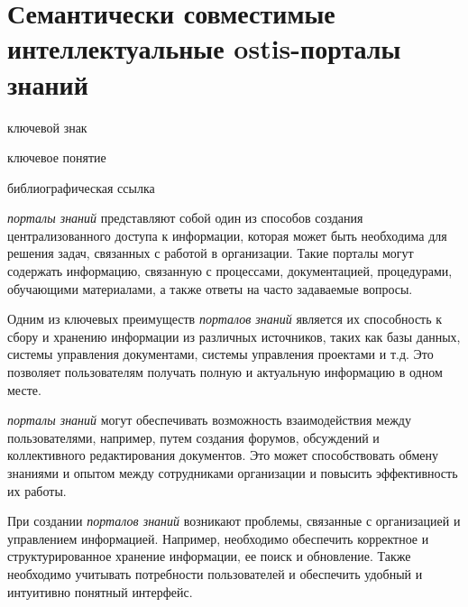 \section{Семантически совместимые интеллектуальные ostis-порталы знаний}
{\label{sec_ostis_scientific_portal}} 

\begin{SCn}

\bigskip

\begin{scnrelfromlist}{ключевой знак}
\end{scnrelfromlist}

\begin{scnrelfromlist}{ключевое понятие}
\end{scnrelfromlist}


\begin{scnrelfromlist}{библиографическая ссылка}
\end{scnrelfromlist}

\end{SCn}

\textit{порталы знаний} представляют собой один из способов создания централизованного доступа к информации, которая может быть необходима для решения задач, связанных с работой в организации. Такие порталы могут содержать информацию, связанную с процессами, документацией, процедурами, обучающими материалами, а также ответы на часто задаваемые вопросы.

Одним из ключевых преимуществ \textit{порталов знаний} является их способность к сбору и хранению информации из различных источников, таких как базы данных, системы управления документами, системы управления проектами и т.д. Это позволяет пользователям получать полную и актуальную информацию в одном месте.

\textit{порталы знаний} могут обеспечивать возможность взаимодействия между пользователями, например, путем создания форумов, обсуждений и коллективного редактирования документов. Это может способствовать обмену знаниями и опытом между сотрудниками организации и повысить эффективность их работы.

При создании \textit{порталов знаний} возникают проблемы, связанные с организацией и управлением информацией. Например, необходимо обеспечить корректное и структурированное хранение информации, ее поиск и обновление. Также необходимо учитывать потребности пользователей и обеспечить удобный и интуитивно понятный интерфейс.

